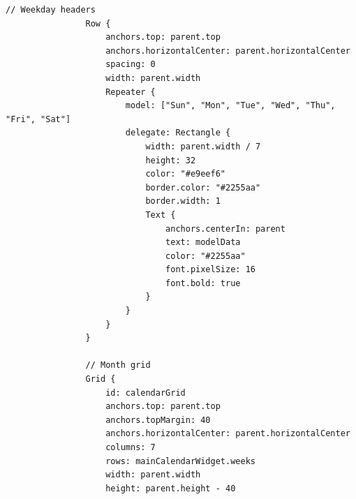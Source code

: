 \documentclass{report}
\begin{document}
\begin{lstlisting}[style=qmlstyle]
                // Weekday headers
                Row {
                    anchors.top: parent.top
                    anchors.horizontalCenter: parent.horizontalCenter
                    spacing: 0
                    width: parent.width
                    Repeater {
                        model: ["Sun", "Mon", "Tue", "Wed", "Thu", "Fri", "Sat"]
                        delegate: Rectangle {
                            width: parent.width / 7
                            height: 32
                            color: "#e9eef6"
                            border.color: "#2255aa"
                            border.width: 1
                            Text {
                                anchors.centerIn: parent
                                text: modelData
                                color: "#2255aa"
                                font.pixelSize: 16
                                font.bold: true
                            }
                        }
                    }
                }
            
                // Month grid
                Grid {
                    id: calendarGrid
                    anchors.top: parent.top
                    anchors.topMargin: 40
                    anchors.horizontalCenter: parent.horizontalCenter
                    columns: 7
                    rows: mainCalendarWidget.weeks
                    width: parent.width
                    height: parent.height - 40
            

\end{lstlisting}
\end{document}
